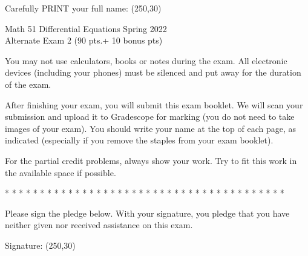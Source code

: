 \documentclass[12pt]{article}
\begin{document}
\noindent
Carefully PRINT your full name:  \framebox(250,30){}


\begin{center}
Math 51 \hfill Differential Equations \hfill Spring 2022\\
Alternate Exam 2 (90 pts.+ 10 bonus pts) 
\end{center}

\medskip


You may not use calculators, books or notes during the exam. All electronic devices (including
your phones) must be silenced and put away for the duration of the
exam.

After finishing your exam, you will submit this exam booklet. We will scan your submission and
upload it to Gradescope for marking (you do not need to take images of your exam). You should
write your name at the top of each page, as indicated (especially if you remove the staples from
your exam booklet).

For the partial credit problems, always show your work. Try to fit this work in the available space
if possible.

* * * * * * * * * * * * * * * * * * * * * * * * * * * * * * * * * * *
* * * * *

Please sign the pledge below. With your signature, you pledge that
you have neither given nor received assistance on this exam.


\bigskip
\bigskip
Signature:  \framebox(250,30){}

\newpage
\end{document}
